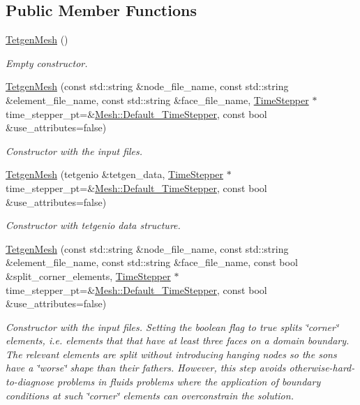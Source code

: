 \subsection*{Public Member Functions}
\begin{DoxyCompactItemize}
\item 
\hyperlink{classoomph_1_1TetgenMesh_a2d2c7796e578f9fed1faf17569893531}{Tetgen\+Mesh} ()
\begin{DoxyCompactList}\small\item\em Empty constructor. \end{DoxyCompactList}\item 
\hyperlink{classoomph_1_1TetgenMesh_a10976b817c361f04da4ce996bd019c02}{Tetgen\+Mesh} (const std\+::string \&node\+\_\+file\+\_\+name, const std\+::string \&element\+\_\+file\+\_\+name, const std\+::string \&face\+\_\+file\+\_\+name, \hyperlink{classoomph_1_1TimeStepper}{Time\+Stepper} $\ast$time\+\_\+stepper\+\_\+pt=\&\hyperlink{classoomph_1_1Mesh_a12243d0fee2b1fcee729ee5a4777ea10}{Mesh\+::\+Default\+\_\+\+Time\+Stepper}, const bool \&use\+\_\+attributes=false)
\begin{DoxyCompactList}\small\item\em Constructor with the input files. \end{DoxyCompactList}\item 
\hyperlink{classoomph_1_1TetgenMesh_ace863f736d0dfa0a059b28959fced51d}{Tetgen\+Mesh} (tetgenio \&tetgen\+\_\+data, \hyperlink{classoomph_1_1TimeStepper}{Time\+Stepper} $\ast$time\+\_\+stepper\+\_\+pt=\&\hyperlink{classoomph_1_1Mesh_a12243d0fee2b1fcee729ee5a4777ea10}{Mesh\+::\+Default\+\_\+\+Time\+Stepper}, const bool \&use\+\_\+attributes=false)
\begin{DoxyCompactList}\small\item\em Constructor with tetgenio data structure. \end{DoxyCompactList}\item 
\hyperlink{classoomph_1_1TetgenMesh_a867b3f70bd0f5063901720d04f28e95e}{Tetgen\+Mesh} (const std\+::string \&node\+\_\+file\+\_\+name, const std\+::string \&element\+\_\+file\+\_\+name, const std\+::string \&face\+\_\+file\+\_\+name, const bool \&split\+\_\+corner\+\_\+elements, \hyperlink{classoomph_1_1TimeStepper}{Time\+Stepper} $\ast$time\+\_\+stepper\+\_\+pt=\&\hyperlink{classoomph_1_1Mesh_a12243d0fee2b1fcee729ee5a4777ea10}{Mesh\+::\+Default\+\_\+\+Time\+Stepper}, const bool \&use\+\_\+attributes=false)
\begin{DoxyCompactList}\small\item\em Constructor with the input files. Setting the boolean flag to true splits \char`\"{}corner\char`\"{} elements, i.\+e. elements that that have at least three faces on a domain boundary. The relevant elements are split without introducing hanging nodes so the sons have a \char`\"{}worse\char`\"{} shape than their fathers. However, this step avoids otherwise-\/hard-\/to-\/diagnose problems in fluids problems where the application of boundary conditions at such \char`\"{}corner\char`\"{} elements can overconstrain the solution. \end{DoxyCompactList}\item 

\end{DoxyCompactItemize}
